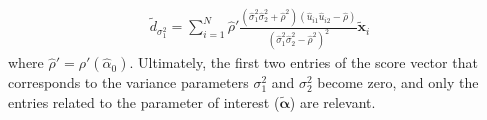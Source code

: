 \documentclass[aoas,authoryear, preprint]{imsart}
\numberwithin{equation}{section}
\theoremstyle{plain}
\begin{document}
\begin{align*}
    \tilde{d}_{\sigma_1^2} = \sum_{i=1}^{N} \hat{\rho}' \frac{(\hat{\sigma}_1^2\hat{\sigma}_2^2 + \hat{\rho}^2)(\hat{u}_{i1}\hat{u}_{i2} - \hat{\rho})}{(\hat{\sigma}_1^2\hat{\sigma}_2^2 - \hat{\rho}^2)^2}\bm{\tilde{x}}_i
\end{align*}
where $\hat{\rho}' = \rho'(\hat{\alpha}_0)$. Ultimately, the first two entries of the score vector that corresponds to the variance parameters $\sigma_1^2$ and $\sigma_2^2$ become zero, and only the entries related to the parameter of interest ($\bm{\tilde{\alpha}}$) are relevant. 
\end{document}
